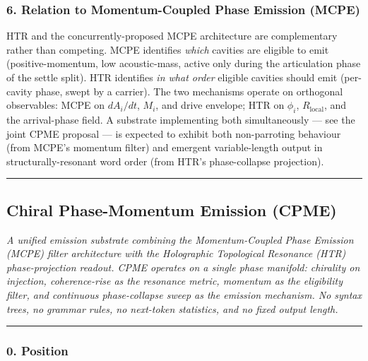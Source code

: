 \documentclass[
  11pt,
  a4paper,
]{article}
\begin{document}
\subsubsection{6. Relation to Momentum-Coupled Phase Emission
(MCPE)}\label{relation-to-momentum-coupled-phase-emission-mcpe}

HTR and the concurrently-proposed MCPE architecture are complementary
rather than competing. MCPE identifies \emph{which} cavities are
eligible to emit (positive-momentum, low acoustic-mass, active only
during the articulation phase of the settle split). HTR identifies
\emph{in what order} eligible cavities should emit (per-cavity phase,
swept by a carrier). The two mechanisms operate on orthogonal
observables: MCPE on \(dA_i/dt\), \(M_i\), and drive envelope; HTR on
\(\phi_i\), \(R_{\text{local}}\), and the arrival-phase field. A
substrate implementing both simultaneously --- see the joint CPME
proposal --- is expected to exhibit both non-parroting behaviour (from
MCPE's momentum filter) and emergent variable-length output in
structurally-resonant word order (from HTR's phase-collapse projection).

\begin{center}\rule{0.5\linewidth}{0.5pt}\end{center}

\newpage

\subsection{Chiral Phase-Momentum Emission
(CPME)}\label{chiral-phase-momentum-emission-cpme}

\emph{A unified emission substrate combining the Momentum-Coupled Phase
Emission (MCPE) filter architecture with the Holographic Topological
Resonance (HTR) phase-projection readout. CPME operates on a single
phase manifold: chirality on injection, coherence-rise as the resonance
metric, momentum as the eligibility filter, and continuous
phase-collapse sweep as the emission mechanism. No syntax trees, no
grammar rules, no next-token statistics, and no fixed output length.}

\begin{center}\rule{0.5\linewidth}{0.5pt}\end{center}

\subsubsection{0. Position}\label{position}
\end{document}
